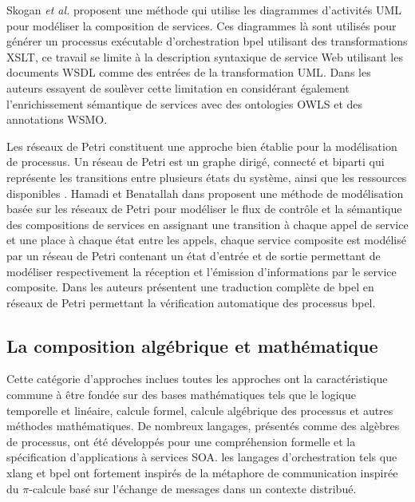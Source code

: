   Skogan \textit{et al.}  \cite{skogan2004web} proposent une méthode
  qui utilise les diagrammes d'activités \textsc{UML} pour modéliser
  la composition de services. Ces diagrammes là sont utilisés pour
  générer un processus exécutable d'orchestration \acrshort{bpel}
  utilisant des transformations \textsc{XSLT}, ce travail se limite à
  la description syntaxique de service Web utilisant les documents
  \textsc{WSDL} comme des entrées de la transformation
  \textsc{UML}. Dans \cite{gronmo2005model} les auteurs essayent de
  soulèver cette limitation en considérant également l'enrichissement
  sémantique de services avec des ontologies \textsc{OWLS} et des
  annotations \textsc{WSMO}.\medskip

  Les réseaux de Petri \cite{petri1962kommunikation} constituent une
  approche bien établie pour la modélisation de processus. Un réseau
  de Petri est un graphe dirigé, connecté et biparti qui représente
  les transitions entre plusieurs états du système, ainsi que les
  ressources disponibles \cite{dumez2010approche}. Hamadi et
  Benatallah dans \cite{hamadi2003petri} proposent une méthode de
  modélisation basée sur les réseaux de Petri pour modéliser le flux
  de contrôle et la sémantique des compositions de services en
  assignant une transition à chaque appel de service et une place à
  chaque état entre les appels, chaque service composite est modélisé
  par un réseau de Petri contenant un état d'entrée et de sortie
  permettant de modéliser respectivement la réception et l'émission
  d'informations par le service composite. Dans
  \cite{ouyang2007formal} les auteurs présentent une traduction
  complète de \acrshort{bpel} en réseaux de Petri permettant la
  vérification automatique des processus \acrshort{bpel}.

  \subsection{La composition algébrique et mathématique}
  \label{sec:les-apprc-math}
  Cette catégorie d'approches inclues toutes les approches ont la
  caractéristique commune à être fondée sur des bases mathématiques
  tels que le logique temporelle et linéaire, calcule formel, calcule
  algébrique des processus et autres méthodes mathématiques. De
  nombreux langages, présentés comme des algèbres de processus, ont
  été développés pour une compréhension formelle et la spécification
  d'applications à services \textsc{SOA}. les langages d'orchestration
  tels que \acrshort{xlang} et \acrshort{bpel} ont fortement inspirés
  de la métaphore de communication inspirée du $\pi$-calcule basé sur
  l'échange de messages dans un contexte distribué.\medskip

